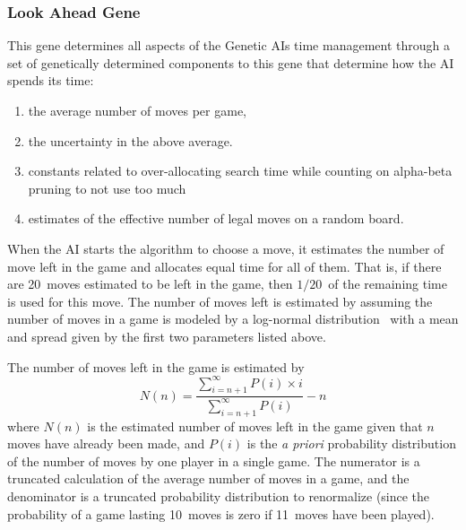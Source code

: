\documentclass[letterpaper]{article}
\renewcommand{\_}{\allowbreak\textunderscore\allowbreak}
\begin{document}
\subsubsection{Look Ahead Gene}\label{look-ahead}
This gene determines all aspects of the Genetic AIs time management through a set of genetically determined components to this gene that determine how the AI spends its time:
\begin{enumerate}
	\item the average number of moves per game,
	\item the uncertainty in the above average.
	\item constants related to over-allocating search time while counting on alpha-beta pruning to not use too much
	\item estimates of the effective number of legal moves on a random board.
\end{enumerate}
When the AI starts the algorithm to choose a move, it estimates the number of move left in the game and allocates equal time for all of them. That is, if there are 20~moves estimated to be left in the game, then \(1/20\)~of the remaining time is used for this move. The number of moves left is estimated by assuming the number of moves in a game is modeled by a log-normal distribution~\cite{log-norm-wiki}\cite{log-norm-chess-se} with a mean and spread given by the first two parameters listed above.

The number of moves left in the game is estimated by
\[N(n) = \frac{\sum_{i = n + 1}^\infty P(i)\times{}i}{\sum_{i = n + 1}^\infty P(i)} - n\]
where \(N(n)\) is the estimated number of moves left in the game given that \(n\) moves have already been made, and \(P(i)\) is the \emph{a priori} probability distribution of the number of moves by one player in a single game. The numerator is a truncated calculation of the average number of moves in a game, and the denominator is a truncated probability distribution to renormalize (since the probability of a game lasting 10~moves is zero if 11~moves have been played).
\end{document}
